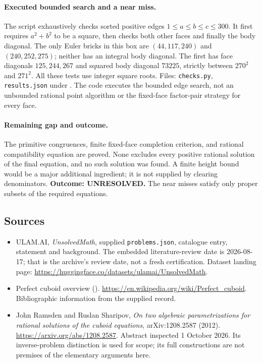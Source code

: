 \documentclass[11pt,a4paper]{article}
\begin{document}
\paragraph{Executed bounded search and a near miss.}
The script exhaustively checks sorted positive edges
$1\le a\le b\le c\le300$. It first requires $a^2+b^2$ to be a
square, then checks both other faces and finally the body diagonal.
The only Euler bricks in this box are $(44,117,240)$ and
$(240,252,275)$; neither has an integral body diagonal. The first has
face diagonals $125,244,267$ and squared body diagonal $73225$,
strictly between $270^2$ and $271^2$. All these tests use integer
square roots. Files: \texttt{checks.py}, \texttt{results.json} under
.
The code executes the bounded edge search, not an unbounded rational
point algorithm or the fixed-face factor-pair strategy for every face.

\paragraph{Remaining gap and outcome.}
The primitive congruences, finite fixed-face completion criterion, and
rational compatibility equation are proved. None excludes every
positive rational solution of the final equation, and no such solution
was found. A finite height bound would be a major additional ingredient;
it is not supplied by clearing denominators. \textbf{Outcome: UNRESOLVED.}
The near misses satisfy only proper subsets of the required equations.

\subsection{Sources}

{\small

\begin{itemize}

\item[\hypertarget{source:statement:1}{S1}] ULAM.AI, \emph{UnsolvedMath}, supplied \texttt{problems.json}, catalogue entry, statement and background. The embedded literature-review date is 2026-08-17; that is the archive’s review date, not a fresh certification. Dataset landing page: \url{https://huggingface.co/datasets/ulamai/UnsolvedMath}.

\item[\hypertarget{source:statement:2}{S2}] Perfect cuboid overview (). \url{https://en.wikipedia.org/wiki/Perfect_cuboid}. Bibliographic information from the supplied record.


\item[E1] John Ramsden and Ruslan Sharipov,
\emph{On two algebraic parametrizations for rational solutions of the
cuboid equations}, arXiv:1208.2587 (2012).
\url{https://arxiv.org/abs/1208.2587}. Abstract inspected 1 October 2026.
Its inverse-problem distinction is used for scope; its full constructions
are not premises of the elementary arguments here.

\end{itemize}

}

\label{end:statement}
\end{document}
